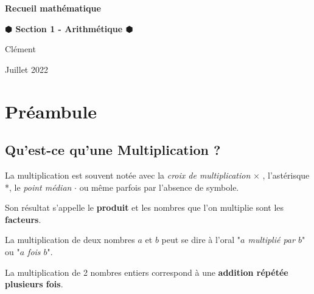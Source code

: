 \documentclass[a4paper, twoside]{article}
\begin{document}
	\begin{titlepage}
		\begin{center}
			
	\Huge  	\textbf{Recueil mathématique}\\
	
		\bigskip \smallskip
			
	\Large	\textbf{$\varhexagonblack$ Section 1 - Arithmétique $\varhexagonblack$}\\
	
		\bigskip
			
	\large	Clément   \\ 
			
		\smallskip
			
	\normalfont	Juillet 2022\\
			
		\end{center}
			
	\doublespacing
	\tableofcontents
	\singlespacing

	\end{titlepage}







	\section{Préambule}

		\subsection*{Qu'est-ce qu'une Multiplication ?}

			La multiplication est souvent notée avec la \textit{croix de multiplication} $\times$ , 
			l'astérisque *, le \textit{point médian} $\cdot$ ou même parfois par l'absence de symbole.
			
			Son résultat s'appelle le \textbf{produit} et les nombres que l'on multiplie sont les \textbf{facteurs}.

			La multiplication de deux nombres $a$ et $b$ peut se dire à l'oral "\textit{$a$ multiplié par $b$}" 
			ou "\textit{$a$ fois $b$}".\\
			
			\vspace{-2 mm}

			La multiplication de 2 nombres entiers correspond à une \textbf{addition répétée plusieurs fois}.
\end{document}
